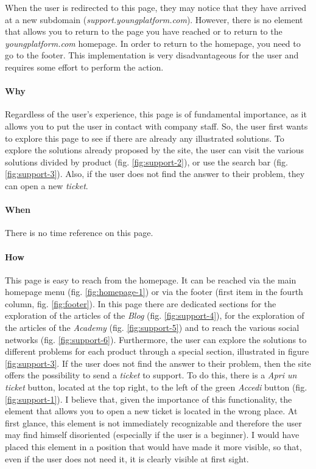 When the user is redirected to this page, they may notice that they have 
arrived at a new subdomain (\textit{support.youngplatform.com}). However, 
there is no element that allows you to return to the page you have reached 
or to return to the \textit{youngplatform.com} homepage. In order to return 
to the homepage, you need to go to the footer. This implementation is very 
disadvantageous for the user and requires some effort to perform the action.

\paragraph{Why}

Regardless of the user's experience, this page is of fundamental 
importance, as it allows you to put the user in contact with company 
staff. So, the user first wants to explore this page to see if there are 
already any illustrated solutions. To explore the solutions already 
proposed by the site, the user can visit the various solutions divided 
by product (fig. \ref{fig:support-2}), or use the search bar (fig. 
\ref{fig:support-3}). Also, if the user does not find the answer to their 
problem, they can open a new \textit{ticket}.

\paragraph{When}

There is no time reference on this page.

\paragraph{How}

This page is easy to reach from the homepage. It can be reached via the 
main homepage menu (fig. \ref{fig:homepage-1}) or via the footer (first 
item in the fourth column, fig. \ref{fig:footer}). In this page there are 
dedicated sections for the exploration of the articles of the \textit{Blog} 
(fig. \ref{fig:support-4}), for the exploration of the articles of the 
\textit{Academy} (fig. \ref{fig:support-5}) and to reach the various 
social networks (fig. \ref{fig:support-6}). Furthermore, the user can 
explore the solutions to different problems for each product through a 
special section, illustrated in figure \ref{fig:support-3}. If the user 
does not find the answer to their problem, then the site offers the 
possibility to send a \textit{ticket} to support. To do this, there is a 
\textit{Apri un ticket} button, located at the top right, to the left of 
the green \textit{Accedi} button (fig. \ref{fig:support-1}). I believe 
that, given the importance of this functionality, the element that allows 
you to open a new ticket is located in the wrong place. At first glance, 
this element is not immediately recognizable and therefore the user may 
find himself disoriented (especially if the user is a beginner). I would 
have placed this element in a position that would have made it more 
visible, so that, even if the user does not need it, it is clearly 
visible at first sight. 